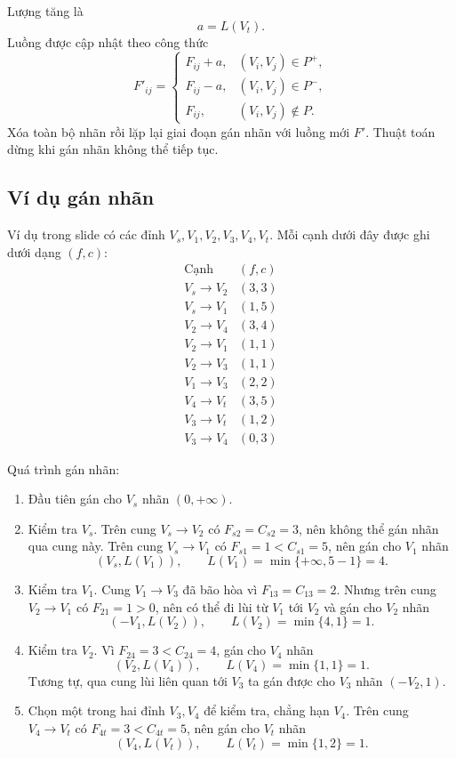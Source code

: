 \documentclass[11pt]{article}
\begin{document}
Lượng tăng là
\[
  a=L(V_t).
\]
Luồng được cập nhật theo công thức
\[
  F'_{ij}=
  \begin{cases}
    F_{ij}+a, & (V_i,V_j)\in P^+,\\
    F_{ij}-a, & (V_i,V_j)\in P^-,\\
    F_{ij},   & (V_i,V_j)\notin P.
  \end{cases}
\]
Xóa toàn bộ nhãn rồi lặp lại giai đoạn gán nhãn với luồng mới $F'$. Thuật toán
dừng khi gán nhãn không thể tiếp tục.

\subsection{Ví dụ gán nhãn}

Ví dụ trong slide có các đỉnh $V_s,V_1,V_2,V_3,V_4,V_t$. Mỗi cạnh dưới đây
được ghi dưới dạng $(f,c)$:
\[
\begin{array}{c|c}
\text{Cạnh} & (f,c)\\ \hline
V_s\to V_2 & (3,3)\\
V_s\to V_1 & (1,5)\\
V_2\to V_4 & (3,4)\\
V_2\to V_1 & (1,1)\\
V_2\to V_3 & (1,1)\\
V_1\to V_3 & (2,2)\\
V_4\to V_t & (3,5)\\
V_3\to V_t & (1,2)\\
V_3\to V_4 & (0,3)
\end{array}
\]

Quá trình gán nhãn:
\begin{enumerate}
  \item Đầu tiên gán cho $V_s$ nhãn $(0,+\infty)$.
  \item Kiểm tra $V_s$. Trên cung $V_s\to V_2$ có $F_{s2}=C_{s2}=3$, nên
  không thể gán nhãn qua cung này. Trên cung $V_s\to V_1$ có
  $F_{s1}=1<C_{s1}=5$, nên gán cho $V_1$ nhãn
  \[
    (V_s,L(V_1)),\qquad L(V_1)=\min\{+\infty,5-1\}=4.
  \]
  \item Kiểm tra $V_1$. Cung $V_1\to V_3$ đã bão hòa vì $F_{13}=C_{13}=2$.
  Nhưng trên cung $V_2\to V_1$ có $F_{21}=1>0$, nên có thể đi lùi từ $V_1$
  tới $V_2$ và gán cho $V_2$ nhãn
  \[
    (-V_1,L(V_2)),\qquad L(V_2)=\min\{4,1\}=1.
  \]
  \item Kiểm tra $V_2$. Vì $F_{24}=3<C_{24}=4$, gán cho $V_4$ nhãn
  \[
    (V_2,L(V_4)),\qquad L(V_4)=\min\{1,1\}=1.
  \]
  Tương tự, qua cung lùi liên quan tới $V_3$ ta gán được cho $V_3$ nhãn
  $(-V_2,1)$.
  \item Chọn một trong hai đỉnh $V_3,V_4$ để kiểm tra, chẳng hạn $V_4$. Trên
  cung $V_4\to V_t$ có $F_{4t}=3<C_{4t}=5$, nên gán cho $V_t$ nhãn
  \[
    (V_4,L(V_t)),\qquad L(V_t)=\min\{1,2\}=1.
  \]
\end{enumerate}
\end{document}
